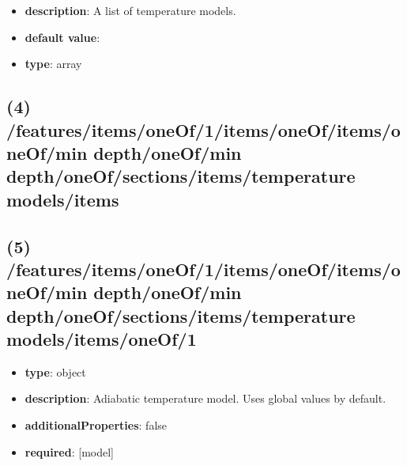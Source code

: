 \begin{itemize}[leftmargin=3em]\item {\bf description}: A list of temperature models.
\item {\bf default value}: 
\item {\bf type}: array
\end{itemize}\subsection{(4) /features/items/oneOf/1/items/oneOf/items/oneOf/min depth/oneOf/min depth/oneOf/sections/items/temperature models/items}

\subsection{(5) /features/items/oneOf/1/items/oneOf/items/oneOf/min depth/oneOf/min depth/oneOf/sections/items/temperature models/items/oneOf/1}
\begin{itemize}[leftmargin=5em]\item {\bf type}: object
\item {\bf description}: Adiabatic temperature model. Uses global values by default.
\item {\bf additionalProperties}: false
\item {\bf required}: [model]\end{itemize}
